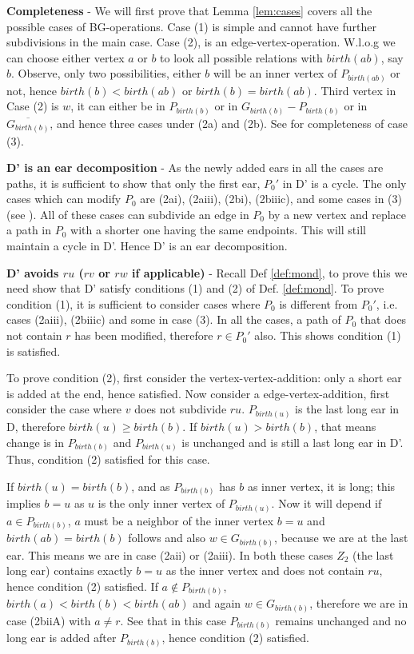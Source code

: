 \textbf{Completeness} - We will first prove that Lemma \ref{lem:cases} covers all the possible cases of BG-operations.
Case (1) is simple and cannot have further subdivisions in the main case.
Case (2), is an edge-vertex-operation.
W.l.o.g we can choose either vertex $a$ or $b$ to look all possible relations with $birth(ab)$, say $b$.
Observe, only two possibilities, either $b$ will be an inner vertex of $P_{birth(ab)}$ or not, hence $birth(b) < birth(ab)$ or $birth(b) = birth(ab)$.
Third vertex in Case (2) is $w$, it can either be in $P_{birth(b)}$ or in $G_{birth(b)} - P_{birth(b)}$ or in $\overline{G_{birth(b)}}$, and hence three cases under (2a) and (2b).
See \cite{Schmidt13a} for completeness of case (3).

\medskip
\textbf{D' is an ear decomposition} - As the newly added ears in all the cases are paths, it is sufficient to show that only the first ear, $P_0'$ in D' is a cycle.
The only cases which can modify $P_0$ are (2ai), (2aiii), (2bi), (2biiic), and some cases in (3) (see \cite{Schmidt13a}).
All of these cases can subdivide an edge in $P_0$ by a new vertex and replace a path in $P_0$ with a shorter one having the same endpoints.
This will still maintain a cycle in D'.
Hence D' is an ear decomposition.

\medskip
\textbf{D' avoids $ru$ ($rv$ or $rw$ if applicable) } - Recall Def \ref{def:mond}, to prove this we need show that D' satisfy conditions (1) and (2) of Def. \ref{def:mond}.
To prove condition (1), it is sufficient to consider cases where $P_0$ is different from $P_0'$, i.e. cases (2aiii), (2biiic) and some in case (3).
In all the cases, a path of $P_0$ that does not contain $r$ has been modified, therefore $r \in P_0'$ also.
This shows condition (1) is satisfied.

To prove condition (2), first consider the vertex-vertex-addition: only a short ear is added at the end, hence satisfied.
Now consider a edge-vertex-addition, first consider the case where $v$ does not subdivide $ru$.
$P_{birth(u)}$ is the last long ear in D, therefore $birth(u) \geq birth(b)$.
If $birth(u) > birth(b)$, that means change is in $P_{birth(b)}$ and $P_{birth(u)}$ is unchanged and is still a last long ear in D'.
Thus, condition (2) satisfied for this case.

If $birth(u) = birth(b)$, and as $P_{birth(b)}$ has $b$ as inner vertex, it is long; this implies $b=u$ as $u$ is the only inner vertex of $P_{birth(u)}$.
Now it will depend if $a \in P_{birth(b)}$, $a$ must be a neighbor of the inner vertex $b=u$ and $birth(ab) = birth(b)$ follows and also $w \in G_{birth(b)}$, because we are at the last ear.
This means we are in case (2aii) or (2aiii).
In both these cases $Z_2$ (the last long ear) contains exactly $b=u$ as the inner vertex and does not contain $ru$, hence condition (2) satisfied.
If $a \notin P_{birth(b)}$, $birth(a) < birth(b) < birth(ab)$ and again $w \in G_{birth(b)}$, therefore we are in case (2biiA) with $a \neq r$.
See that in this case $P_{birth(b)}$ remains unchanged and no long ear is added after $P_{birth(b)}$, hence condition (2) satisfied.

